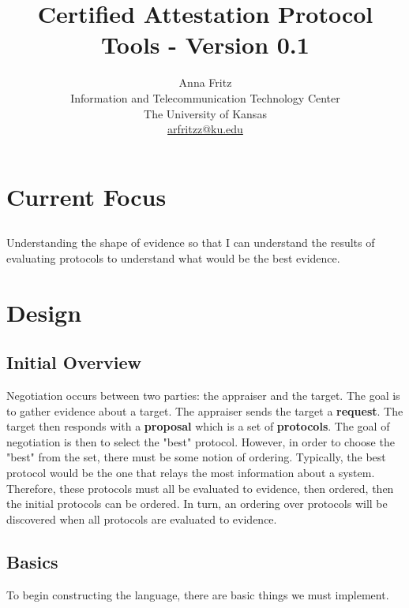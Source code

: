 \documentclass[10pt]{report}
\title{Certified Attestation Protocol Tools - Version 0.1}
\author{Anna Fritz \\
  Information and Telecommunication Technology Center \\
  The University of Kansas \\
  \url{arfritzz@ku.edu}
}
\begin{document}
\chapter {Current Focus}

\section {}

Understanding the shape of evidence so that I can understand
the results of evaluating protocols to understand what 
would be the best evidence. 

\chapter {Design}

\section {Initial Overview}

Negotiation occurs between two parties: the appraiser and the target.
The goal is to gather evidence about a target. The appraiser sends the
target a \textbf{request}. The target then responds
with a \textbf{proposal} which is a set of \textbf{protocols}. The goal of
negotiation is then to select the "best" protocol. However, in order to
choose the "best" from the set, there must be some notion of ordering.
Typically, the best protocol would be the one that relays the most 
information about a system. Therefore, these protocols must all be evaluated
to evidence, then ordered, then the initial protocols can be ordered. 
In turn, an ordering over protocols will be discovered when all 
protocols are evaluated to evidence.  

\section {Basics}

To begin constructing the language, there are basic things we must implement. 
\end{document}
